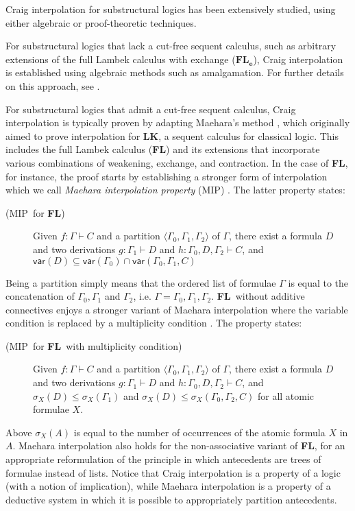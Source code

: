 \documentclass[sn-mathphys-num]{sn-jnl}%
\newcommand{\GG}{\Gamma}
\newcommand{\mf}[1]{\mathsf{#1}}
\newcommand{\gs}[1]{\sigma_{X} (#1)}
\newcommand{\vars}[1]{\mf{var} (#1)}
\newcommand{\FL}{\textbf{FL}}
\newcommand{\MIP}{\textsf{MIP}}
\theoremstyle{thmstyleone}%
\theoremstyle{thmstyletwo}%
\theoremstyle{thmstylethree}%
\begin{document}
Craig interpolation for substructural logics has been extensively studied, using either algebraic or proof-theoretic techniques. 

For substructural logics that lack a cut-free sequent calculus, such as arbitrary extensions of the full Lambek calculus with exchange ($\FL_{\textbf{e}}$), Craig interpolation is established using algebraic methods such as amalgamation.
For further details on this approach, see \cite{Kihara2009}.

For substructural logics that admit a cut-free sequent calculus, Craig interpolation is typically proven by adapting Maehara's method \cite{maehara1961}, which originally aimed to prove interpolation for $\mathbf{LK}$, a sequent calculus for classical logic.
This includes the full Lambek calculus (\FL) and its extensions that incorporate various combinations of weakening, exchange, and contraction.
In the case of \FL, for instance, the proof starts by establishing a stronger form of interpolation which we call \emph{Maehara interpolation property} (\MIP) \cite{ono:proof:nonclassical:1998}. 
The latter property states:
\begin{description}
  \item[(\MIP~for \FL)] Given $f : \Gamma \vdash C$ and a partition $\langle \Gamma_0, \Gamma_1, \Gamma_2 \rangle$ of $\Gamma$, there exist a formula $D$ and two derivations $g : \Gamma_1 \vdash D$ and $h : \Gamma_0, D, \Gamma_2 \vdash C$, and $\vars{D} \subseteq \vars{\Gamma_0} \cap \vars{\Gamma_0, \Gamma_1, C}$
\end{description}
Being a partition simply means that the ordered list of formulae $\Gamma$ is equal to the concatenation of $\Gamma_0, \Gamma_1$ and $\Gamma_2$, i.e. $\Gamma = \Gamma_0, \Gamma_1, \Gamma_2$. 
\FL~without additive connectives enjoys a stronger variant of Maehara interpolation where the variable condition is replaced by a  multiplicity condition \cite{roorda1991,moot:categorial:2012}.
The property states:
\begin{description}
  \item[(\MIP~for \FL~with multiplicity condition)] Given $f : \Gamma \vdash C$ and a partition $\langle \Gamma_0, \Gamma_1, \Gamma_2 \rangle$ of $\Gamma$, there exist a formula $D$ and two derivations $g : \Gamma_1 \vdash D$ and $h : \Gamma_0, D, \Gamma_2 \vdash C$, and $\gs{D} \leq \gs{\GG_1}$ and $\gs{D} \leq \gs{\GG_0, \GG_2 , C}$ for all atomic formulae $X$.
\end{description}
Above $\gs{A}$ is equal to the number of occurrences of the atomic formula $X$ in $A$.
Maehara interpolation also holds for the non-associative variant of \FL, for an appropriate reformulation of the principle in which antecedents are trees of formulae instead of lists.
Notice that Craig interpolation is a property of a logic (with a notion of implication), while Maehara interpolation is a property of a deductive system in which it is possible to appropriately partition antecedents.
\end{document}

